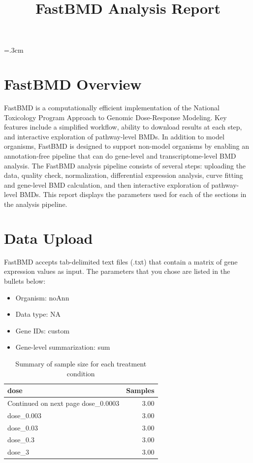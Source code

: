 \documentclass[a4paper]{article}
\title{FastBMD Analysis Report}
\begin{document}
\parskip=.3cm
\maketitle
\section{FastBMD Overview}
 FastBMD is a computationally efficient implementation of the National Toxicology Program Approach to Genomic Dose-Response Modeling.  Key features include a simplified workflow, ability to download results at each step, and interactive exploration  of pathway-level BMDs. In addition to model organisms, FastBMD is designed to support non-model organisms by  enabling an annotation-free pipeline that can do gene-level and transcriptome-level BMD analysis.  The FastBMD analysis pipeline consists of several steps: uploading the data, quality check,  normalization, differential expression analysis, curve fitting and gene-level BMD calculation,  and then interactive exploration of pathway-level BMDs. This report displays the parameters used  for each of the sections in the analysis pipeline. 
\section{Data Upload}
 FastBMD accepts tab-delimited text files (.txt) that contain a matrix of gene expression values as input.  The parameters that you chose are listed in the bullets below:  \begin{itemize} \item{Organism:  noAnn } \item{Data type:  NA } \item{Gene IDs:  custom } \item{Gene-level summarization:  sum } \end{itemize} 

\begingroup\scriptsize
\begin{longtable}{lr}
\caption{Summary of sample size for each treatment condition} \\ 
  \hline
dose & Samples \\ 
  \hline 
\endhead 
\hline 
{\footnotesize Continued on next page} 
\endfoot 
\endlastfoot 
dose\_0.0003 & 3.00 \\ 
  dose\_0.003 & 3.00 \\ 
  dose\_0.03 & 3.00 \\ 
  dose\_0.3 & 3.00 \\ 
  dose\_3 & 3.00 \\ 
  \hline
\end{longtable}
\endgroup
\end{document}
